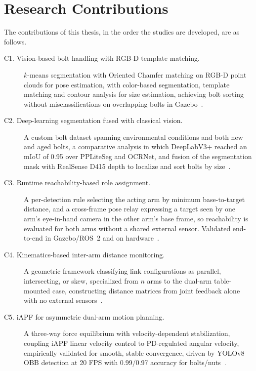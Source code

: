 \section{Research Contributions}\label{sec:intro_contributions}

The contributions of this thesis, in the order the studies are developed, are as follows.

\begin{description}
    \item[C1. Vision-based bolt handling with RGB-D template matching.] $k$-means segmentation
    with Oriented Chamfer matching on RGB-D point clouds for pose estimation, with color-based
    segmentation, template matching and contour analysis for size estimation, achieving bolt sorting without misclassifications on overlapping bolts in Gazebo~\citep{sk2024bolthandling}.

    \item[C2. Deep-learning segmentation fused with classical vision.] A custom bolt dataset
    spanning environmental conditions and both new and aged bolts, a comparative analysis in which
    DeepLabV3+ reached an mIoU of 0.95 over PPLiteSeg and OCRNet, and fusion of the segmentation
    mask with RealSense D415 depth to localize and sort bolts by size~\citep{sk2024boltsorting}.

    \item[C3. Runtime reachability-based role assignment.] A per-detection rule selecting the
    acting arm by minimum base-to-target distance, and a cross-frame pose relay expressing a target
    seen by one arm's eye-in-hand camera in the other arm's base frame, so reachability is evaluated
    for both arms without a shared external sensor. Validated end-to-end in Gazebo/ROS~2 and on
    hardware~\citep{sk2025sharedvision}.

    \item[C4. Kinematics-based inter-arm distance monitoring.] A geometric framework classifying
    link configurations as parallel, intersecting, or skew, specialized from $n$ arms to the
    dual-arm table-mounted case, constructing distance matrices from joint feedback alone with no
    external sensors~\citep{sk2025distance}.

    \item[C5. iAPF for asymmetric dual-arm motion planning.] A three-way force equilibrium with
    velocity-dependent stabilization, coupling iAPF linear velocity control to PD-regulated angular
    velocity, empirically validated for smooth, stable convergence, driven by YOLOv8 OBB detection
    at 20 FPS with 0.99/0.97 accuracy for bolts/nuts~\citep{surya2025iapf}.


\end{description}
